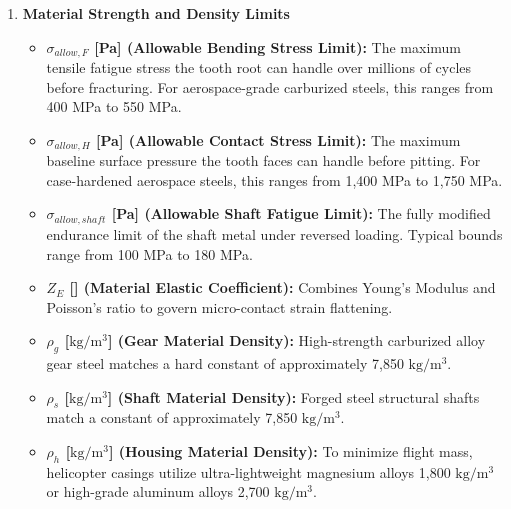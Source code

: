 \begin{enumerate}
            \item \textbf{Material Strength and Density Limits}\par
                \begin{itemize}
                    \item \textbf{$\sigma_{allow,F}$ [Pa] (Allowable Bending Stress Limit):} The maximum tensile fatigue stress the tooth root can handle over millions of cycles before fracturing. For aerospace-grade carburized steels, this ranges from 400 MPa to 550 MPa.
                    \item \textbf{$\sigma_{allow,H}$ [Pa] (Allowable Contact Stress Limit):} The maximum baseline surface pressure the tooth faces can handle before pitting. For case-hardened aerospace steels, this ranges from 1,400 MPa to 1,750 MPa.
                    \item \textbf{$\sigma_{allow,shaft}$ [Pa] (Allowable Shaft Fatigue Limit):} The fully modified endurance limit of the shaft metal under reversed loading. Typical bounds range from 100 MPa to 180 MPa.
                    \item \textbf{$Z_{E}$ [\text{[Pa$^{0.5}$]}] (Material Elastic Coefficient):} Combines Young's Modulus and Poisson's ratio to govern micro-contact strain flattening.
                    \item \textbf{$\rho_{g}$ [$\text{kg}/\text{m}^3$] (Gear Material Density):} High-strength carburized alloy gear steel matches a hard constant of approximately 7,850 $\text{kg}/\text{m}^3$.
                    \item \textbf{$\rho_{s}$ [$\text{kg}/\text{m}^3$] (Shaft Material Density):} Forged steel structural shafts match a constant of approximately 7,850 $\text{kg}/\text{m}^3$.
                    \item \textbf{$\rho_{h}$ [$\text{kg}/\text{m}^3$] (Housing Material Density):} To minimize flight mass, helicopter casings utilize ultra-lightweight magnesium alloys 1,800 $\text{kg}/\text{m}^3$ or high-grade aluminum alloys 2,700 $\text{kg}/\text{m}^3$.
                \end{itemize}
            

\end{enumerate}
